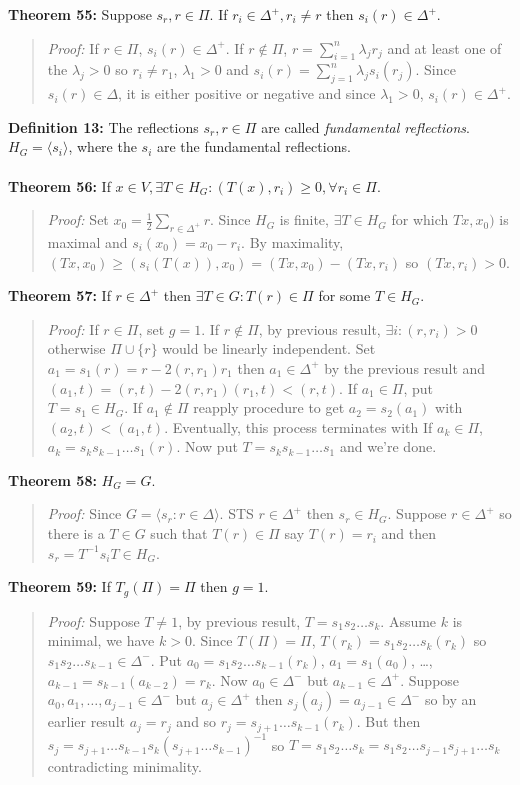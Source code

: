 {\bf Theorem 55:}
Suppose $s_r, r \in \Pi$.  If $r_i \in \Delta^+, r_i \ne r$ then $s_i (r) \in \Delta^+$.
\begin{quote}
\emph{Proof:}  
If $r \in \Pi$, $s_i(r) \in \Delta^+$.  If $r \notin \Pi$, 
$r= \sum_{i=1}^n \lambda_j r_j$ and at least one of the $\lambda_j >0$ so
$r_i \ne r_1$, $\lambda_1>0$ and
$s_i(r) = \sum_{j=1}^n \lambda_j s_i(r_j)$.  Since $s_i(r) \in \Delta$,
it is either positive or negative and since $\lambda_1>0$, $s_i(r) \in \Delta^+$.
\end{quote}
{\bf Definition 13:} 
The reflections $s_r , r \in \Pi$ are called \emph{fundamental reflections}.
$H_G= \langle s_i \rangle$, where the $s_i$ are the fundamental reflections.
\\
\\
{\bf Theorem 56:}
If $x \in V, \exists T \in H_G: (T(x), r_i) \ge 0, \forall r_i \in \Pi$.
\begin{quote}
\emph{Proof:}  
Set $x_0= {\frac 1 2} \sum_{r \in \Delta^+} r$.  Since $H_G$ is finite,
$\exists T \in H_G$ for which $Tx,x_0)$ is maximal and $s_i(x_0)= x_0 - r_i$.
By maximality, $(Tx,x_0) \ge ( s_i(T(x)) , x_0) = (Tx, x_0) - (Tx, r_i)$ so
$(Tx, r_i) > 0$.
\end{quote}
{\bf Theorem 57:}
If $r \in \Delta^+$ then $\exists T \in G: T(r) \in \Pi$ for some $T \in H_G$.
\begin{quote}
\emph{Proof:} 
If $r \in \Pi$, set $g=1$.
If $r \notin \Pi$, by previous result, $\exists i: (r, r_i) >0$ otherwise
$\Pi \cup \{r \}$ would be linearly independent.  Set
$a_1= s_1(r)= r-2(r,r_1) r_1$ then $a_1 \in \Delta^+$ by the previous result and
$(a_1, t)= (r, t)- 2 (r, r_1) (r_1, t)< (r,t)$.
If $a_1 \in \Pi$, put $T= s_1 \in H_G$.
If $a_1 \notin \Pi$ reapply procedure to get $a_2= s_2(a_1)$ with $(a_2, t) < (a_1, t)$.
Eventually, this process terminates with
If $a_k \in \Pi$, $a_k= s_k s_{k-1} \ldots s_1(r)$.  Now put
$T= s_k s_{k-1} \ldots s_1$ and we're done.
\end{quote}
{\bf Theorem 58:}
$H_G=G$.
\begin{quote}
\emph{Proof:}  
Since $G= \langle s_r: r \in \Delta \rangle$.  STS $r \in \Delta^+$ then $s_r \in H_G$.
Suppose $r \in \Delta^+$ so there is a $T \in G$ such that $T(r) \in \Pi$ say $T(r)= r_i$
and then $s_r= T^{-1} s_i T \in H_G$.
\end{quote}
{\bf Theorem 59:}
If $T_g(\Pi)= \Pi$ then $g=1$.
\begin{quote}
\emph{Proof:} 
Suppose $T \ne 1$, by previous result, 
$T= s_1 s_2 \ldots s_k$.  Assume $k$ is minimal, we have $k>0$.
Since $T(\Pi)= \Pi$,
$T(r_k)= s_1 s_2 \ldots s_k(r_k)$
so
$s_1 s_2 \ldots s_{k-1} \in \Delta^-$.  Put
$a_0= s_1 s_2 \ldots s_{k-1}(r_k)$,
$a_1= s_1(a_0)$, \ldots,
$a_{k-1}= s_{k-1} (a_{k-2})= r_k$.  
Now $a_0 \in \Delta^-$ but
$a_{k-1} \in \Delta^+$.
Suppose
$a_0, a_1, \ldots, a_{j-1} \in \Delta^-$ but
$a_{j} \in \Delta^+$ then 
$s_j(a_j)= a_{j-1} \in \Delta^-$ so by an earlier result $a_j=r_j$ and so
$r_j= s_{j+1} \ldots s_{k-1}(r_k)$.  But then
$s_j= s_{j+1} \ldots s_{k-1} s_k (s_{j+1} \ldots s_{k-1})^{-1}$ so 
$T = s_1 s_2 \ldots s_k = s_1 s_2 \ldots s_{j-1} s_{j+1} \ldots s_k $ contradicting minimality.
\end{quote}
